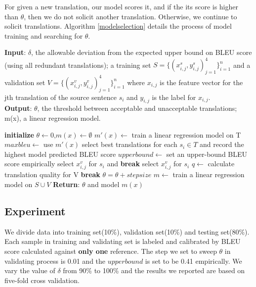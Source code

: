 \documentclass[11pt,letterpaper]{article}
\begin{document}
For given a new translation, our model scores it, and if the its score is higher than $\theta$, then we do not solicit another translation. Otherwise, we continue to solicit translations.  Algorithm \ref{modelselection} details the process of model training and searching for $\theta$. 
\begin{algorithm} [h!]
\caption{}\label{modelselection}
\textbf{Input}: $\delta$, the allowable deviation from the expected upper bound on BLEU score (using all redundant translations); a training set $S = \{(x^{s}_{i,j},y^{s}_{i,j})_{j=1}^{4}\}_{i=1}^n$ and a validation set $V = \{(x^{v}_{i,j},y^{v}_{i,j})_{j=1}^{4}\}_{i=1}^n$ where $x_{i,j}$ is the feature vector for the jth translation of the source sentence $s_{i}$ and $y_{i,j}$ is the label for $x_{i,j}$.\\
\textbf{Output}: $\theta$, the threshold between acceptable and unacceptable translations; m(x), a linear regression model. 
\begin{algorithmic}[1]
\State \textbf{initialize} $\theta \leftarrow 0$,$m(x)\leftarrow \emptyset$ 
\State $m'(x)\leftarrow$ train a linear regression model on T
\State $maxbleu \leftarrow$ use $m'(x)$ select best translations for each $s_i \in T$ and record the highest model predicted BLEU score
\State $upperbound \leftarrow$ set an upper-bound BLEU score empirically
             select $x^{v}_{i,j}$ for $s_i$ and \textbf{break}
\EndIf
{} select $x^{v}_{i,j}$ for $s_i$
\EndIf
\EndFor
\EndFor
\State $q \leftarrow$ calculate translation quality for V
 \textbf{break}
\Else \text{  } $\theta = \theta + stepsize$
\EndIf
\EndWhile
\State $m \leftarrow$ train a linear regression model on $S \cup V$
\State \textbf{Return}: $\theta$ and model $m(x)$
\end{algorithmic}
\end{algorithm}


\subsection{Experiment}
 We divide data into training set(10\%), validation set(10\%) and testing set(80\%). Each sample in training and validating set is labeled and calibrated by BLEU score calculated against \textbf{only one} reference. The step we set to sweep $\theta$ in validating process is 0.01 and the $upperbound$ is set to be 0.41 empirically. We vary the value of $\delta$ from 90\% to 100\% and the results we reported are based on five-fold cross validation.
\end{document}
